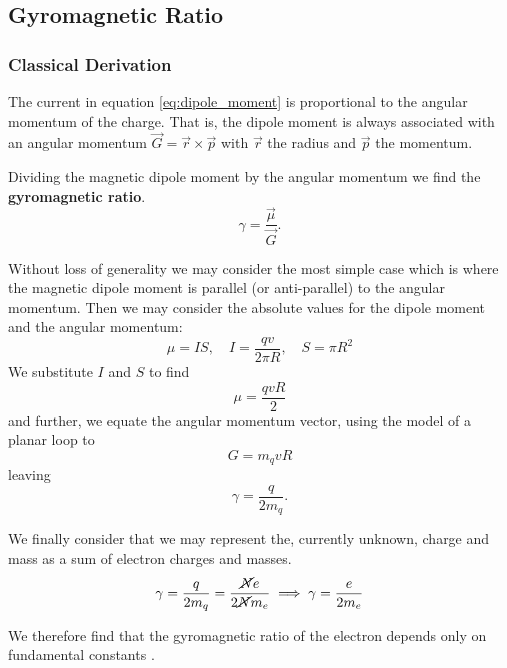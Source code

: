\subsection{Gyromagnetic Ratio}
\subsubsection{Classical Derivation}
The current in equation \ref{eq:dipole_moment} is proportional to the angular momentum of the charge. That is, the dipole moment is always associated with an angular momentum $\vec{G} = \vec{r} \times \vec{p}$ with $\vec{r}$ the radius and $\vec{p}$ the momentum. 

Dividing the magnetic dipole moment by the angular momentum we find the \textbf{gyromagnetic ratio}. 
\begin{equation}
    \gamma = \frac{\vec{\mu}}{\vec{G}}.
    \label{eq:gyromagnetic_ratio}
\end{equation}

Without loss of generality we may consider the most simple case which is where the magnetic dipole moment is parallel (or anti-parallel) to the angular momentum. Then we may consider the absolute values for the dipole moment and the angular momentum: 
\begin{equation}
    \mu = IS, \quad I = 
    \frac{qv}{2\pi R},
    \quad S = \pi R^2 
\end{equation}
We substitute $I$ and $S$ to find 
\begin{equation}
    \mu = \frac{qvR}{2} 
\end{equation}
and further, we equate the angular momentum vector, using the model of a planar loop to 
\begin{equation}
   G= m_q v R 
\end{equation}
leaving 
\begin{equation}
    \gamma = \frac{q}{2m_q } . 
\end{equation}

We finally consider that we may represent the, currently unknown, charge and mass as a sum of electron charges and masses. 
\begin{equation}
    \gamma = \frac{q}{2m_q } = \frac{\cancel{N}e}{2\cancel{N} m_e} \implies \gamma = \frac{e}{2 m_e}
    \label{eq:gyromagnetic_ratio}
\end{equation}

We therefore find that the gyromagnetic ratio of the electron depends only on fundamental constants \cite{bromley2000quantum}.



